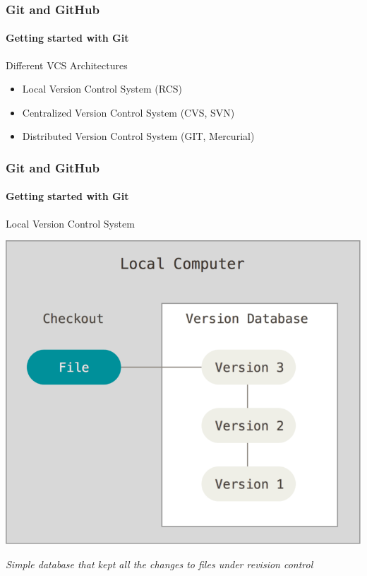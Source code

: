 \begin{frame}
    \frametitle{Git and GitHub}
    \framesubtitle{Getting started with Git}
    \addtocounter{nframe}{1}
    
    \begin{block}{Different VCS Architectures}
        \begin{itemize}
            \item Local Version Control System (RCS)
            \item Centralized Version Control System (CVS, SVN)
            \item Distributed Version Control System (GIT, Mercurial)
        \end{itemize}
    \end{block}

\end{frame}

\begin{frame}
    \frametitle{Git and GitHub}
    \framesubtitle{Getting started with Git}
    \addtocounter{nframe}{1}
    
    \begin{block}{Local Version Control System}
        \begin{center}

            \includegraphics[width=.7\textwidth]{imgs/local.png}
    
        \end{center}
    
    \end{block}

    \textit{Simple database that kept all the changes to files under revision control}

\end{frame}

